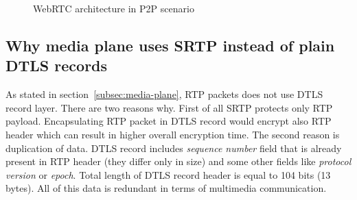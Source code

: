 \begin{figure}
    \centering
    \caption{WebRTC architecture in P2P scenario}
    \label{fig:webrtc-architecture}
\end{figure}

\FloatBarrier

\subsection{Why media plane uses SRTP instead of plain DTLS records}
\label{subsec:why-media-plane-uses-srtp-instead-of-plain-dtls-records}
As stated in section~\ref{subsec:media-plane}, RTP packets does not use DTLS record layer.
There are two reasons why.
First of all SRTP protects only RTP payload.
Encapsulating RTP packet in DTLS record would encrypt also RTP header which can result in higher overall encryption time.
The second reason is duplication of data.
DTLS record includes \textit{sequence number} field that is already present in RTP header (they differ only in size)
and some other fields like \textit{protocol version} or \textit{epoch}.
Total length of DTLS record header is equal to 104 bits (13 bytes).
All of this data is redundant in terms of multimedia communication.


